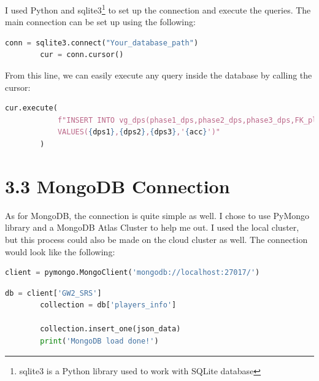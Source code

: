 \documentclass[12pt,a4paper]{article}
\begin{document}
    I used Python and sqlite3\footnote{sqlite3 is a Python library used to work with SQLite database} to set 
    up the connection and execute the queries. The main connection can be set up using the following:

    \begin{lstlisting}[language=Python, caption=SQLite Connection]
        conn = sqlite3.connect("Your_database_path")
        cur = conn.cursor()
    \end{lstlisting}

    \bigskip

    From this line, we can easily execute any query inside the database by calling the cursor:

    \begin{lstlisting}[language=Python, caption=Query example]
        cur.execute(
            f"INSERT INTO vg_dps(phase1_dps,phase2_dps,phase3_dps,FK_player_id) \
            VALUES({dps1},{dps2},{dps3},'{acc}')"
        )
    \end{lstlisting}

    \newpage

    \section*{3.3 MongoDB Connection}
    As for MongoDB, the connection is quite simple as well. I chose to use PyMongo library and 
    a MongoDB Atlas Cluster to help me out. I used the local cluster, but this process could also
    be made on the cloud cluster as well. The connection would look like the following:

    \begin{lstlisting}[language=Python, caption=MongoDB Connection]
        client = pymongo.MongoClient('mongodb://localhost:27017/')
    \end{lstlisting}

    \begin{lstlisting}[language=Python, caption=MongoDB data load]
        db = client['GW2_SRS']
        collection = db['players_info']

        collection.insert_one(json_data)
        print('MongoDB load done!')
    \end{lstlisting}
\end{document}
